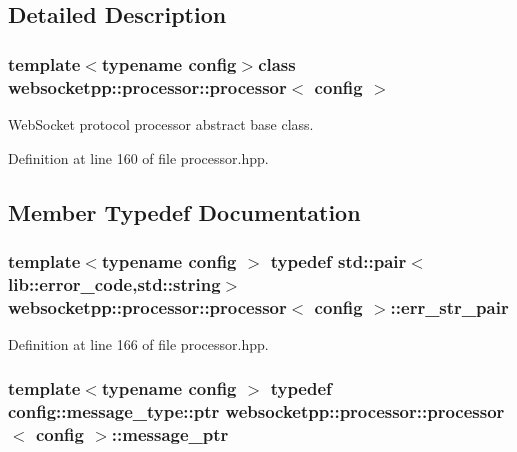 \subsection{Detailed Description}
\subsubsection*{template$<$typename config$>$class websocketpp\+::processor\+::processor$<$ config $>$}

Web\+Socket protocol processor abstract base class. 

Definition at line 160 of file processor.\+hpp.



\subsection{Member Typedef Documentation}
\hypertarget{classwebsocketpp_1_1processor_1_1processor_aa17cb49b100ed209ca8650895812be11}{}
\subsubsection[{err\+\_\+str\+\_\+pair}]{\setlength{\rightskip}{0pt plus 5cm}template$<$typename config $>$ typedef std\+::pair$<$lib\+::error\+\_\+code,std\+::string$>$ {\bf websocketpp\+::processor\+::processor}$<$ config $>$\+::{\bf err\+\_\+str\+\_\+pair}}\label{classwebsocketpp_1_1processor_1_1processor_aa17cb49b100ed209ca8650895812be11}


Definition at line 166 of file processor.\+hpp.

\hypertarget{classwebsocketpp_1_1processor_1_1processor_a7f189eb2eb87b7293d46026fa0950635}{}
\subsubsection[{message\+\_\+ptr}]{\setlength{\rightskip}{0pt plus 5cm}template$<$typename config $>$ typedef config\+::message\+\_\+type\+::ptr {\bf websocketpp\+::processor\+::processor}$<$ config $>$\+::{\bf message\+\_\+ptr}}\label{classwebsocketpp_1_1processor_1_1processor_a7f189eb2eb87b7293d46026fa0950635}


